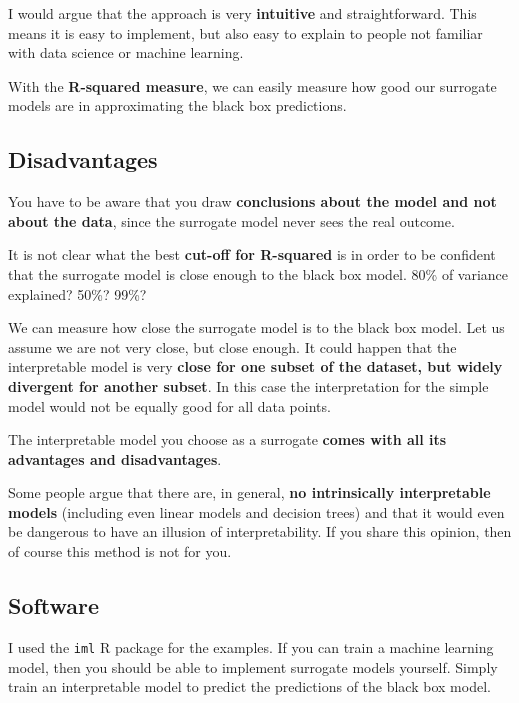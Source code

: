 \documentclass[
  10pt,
]{scrbook}
\begin{document}
I would argue that the approach is very \textbf{intuitive} and straightforward.
This means it is easy to implement, but also easy to explain to people not familiar with data science or machine learning.

With the \textbf{R-squared measure}, we can easily measure how good our surrogate models are in approximating the black box predictions.

\hypertarget{disadvantages-10}{%
\subsection{Disadvantages}\label{disadvantages-10}}

You have to be aware that you draw \textbf{conclusions about the model and not about the data}, since the surrogate model never sees the real outcome.

It is not clear what the best \textbf{cut-off for R-squared} is in order to be confident that the surrogate model is close enough to the black box model.
80\% of variance explained? 50\%? 99\%?

We can measure how close the surrogate model is to the black box model.
Let us assume we are not very close, but close enough.
It could happen that the interpretable model is very \textbf{close for one subset of the dataset, but widely divergent for another subset}.
In this case the interpretation for the simple model would not be equally good for all data points.

The interpretable model you choose as a surrogate \textbf{comes with all its advantages and disadvantages}.

Some people argue that there are, in general, \textbf{no intrinsically interpretable models} (including even linear models and decision trees) and that it would even be dangerous to have an illusion of interpretability.
If you share this opinion, then of course this method is not for you.

\hypertarget{software-4}{%
\subsection{Software}\label{software-4}}

I used the \texttt{iml} R package for the examples.
If you can train a machine learning model, then you should be able to implement surrogate models yourself.
Simply train an interpretable model to predict the predictions of the black box model.

\newpage
\end{document}
